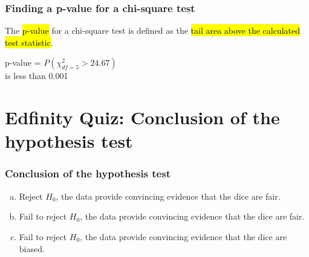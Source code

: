 \documentclass[slidestop,compress,mathserif]{beamer}
\makeatletter
\def\chp6@path{../../Chp 6}
\makeatother
\begin{document}

\begin{frame}
\frametitle{Finding a p-value for a chi-square test}

The \hl{p-value} for a chi-square test is defined as the \hl{tail area above the calculated test statistic}.

{
p-value = $P(\chi^2_{df = 5} > 24.67)$\\ is less than 0.001
}

\end{frame}


\section{Edfinity Quiz: Conclusion of the hypothesis test}


\begin{frame}
\frametitle{Conclusion of the hypothesis test}


\begin{enumerate}[(a)]
\item Reject $H_0$, the data provide convincing evidence that the dice are fair.
\item Fail to reject $H_0$, the data provide convincing evidence that the dice are fair.
\item Fail to reject $H_0$, the data provide convincing evidence that the dice are biased.
\end{enumerate}

\end{frame}

\end{document}
